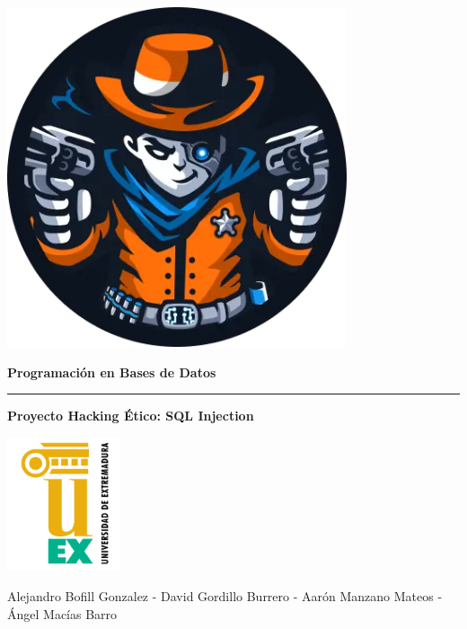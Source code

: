 \documentclass[a4paper,12pt]{article}
\begin{document}
\begin{titlepage}
    \centering

    \includegraphics[width=0.75\textwidth]{Imagenes/fotoportada.png} %

    \vspace{1cm}

    {\Huge \textbf{Programación en Bases de Datos} \par}

    \vspace{0.3cm}

    \rule{\linewidth}{0.1mm}

    \vspace{0.3cm}

    {\LARGE \textbf{Proyecto Hacking Ético: SQL Injection} \par}

    \vspace{1.5cm}

    \includegraphics[width=0.25\textwidth]{Imagenes/logounex.png} %

    \vfill

    {\footnotesize Alejandro Bofill Gonzalez - David Gordillo Burrero - Aarón Manzano Mateos - Ángel Macías Barro \par}

\end{titlepage}

\newpage

\begin{center}
    \renewcommand{\contentsname}{Índice de contenidos}\tableofcontents
\end{center}
\end{document}
